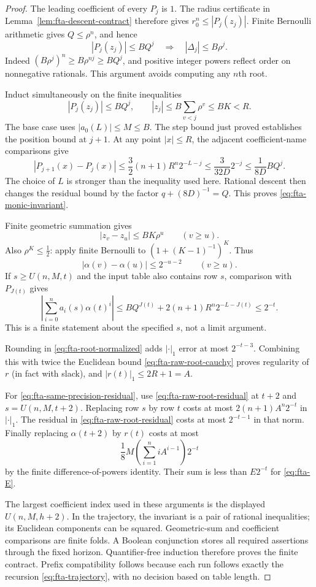 \begin{proof}
The leading coefficient of every $P_j$ is $1$.  The radius certificate
in Lemma~\ref{lem:fta-descent-contract} therefore gives
$r_0^n\le |P_j(z_j)|$.  Finite Bernoulli arithmetic gives
$Q\le\rho^n$, and hence
\[
 |P_j(z_j)|\le BQ^j\quad\Longrightarrow\quad
 |\Delta_j|\le B\rho^j.
\]
Indeed $(B\rho^j)^n\ge B\rho^{nj}\ge BQ^j$, and positive integer
powers reflect order on nonnegative rationals.  This argument avoids
computing any $n$th root.

Induct simultaneously on the finite inequalities
\[
 |P_j(z_j)|\le BQ^j,
 \qquad |z_j|\le B\sum_{v<j}\rho^v\le BK<R.
 \tag{F7}\label{eq:fta-monic-invariant}
\]
The base case uses $|a_0(L)|\le M\le B$.  The step bound just proved
establishes the position bound at $j+1$.  At any point $|x|\le R$, the
adjacent coefficient-name comparisons give
\[
 |P_{j+1}(x)-P_j(x)|
 \le\frac32(n+1)R^n2^{-L-j}
 \le\frac{3}{32D}2^{-j}
 \le\frac{1}{8D}BQ^j.
\]
The choice of $L$ is stronger than the inequality used here.  Rational
descent then changes the residual bound by the factor
$q+(8D)^{-1}=Q$.  This proves \eqref{eq:fta-monic-invariant}.

Finite geometric summation gives
\[
 |z_v-z_u|\le BK\rho^u\qquad(v\ge u).
\]
Also $\rho^K\le\tfrac12$: apply finite Bernoulli to
$(1+(K-1)^{-1})^K$.  Thus
\[
 |\alpha(v)-\alpha(u)|\le 2^{-u-2}\qquad(v\ge u).
 \tag{F8}\label{eq:fta-raw-root-cauchy}
\]
If $s\ge U(n,M,t)$ and the input table also contains row $s$, comparison
with $P_{J(t)}$ gives
\[
 \left|\sum_{i=0}^n a_i(s)\alpha(t)^i\right|
 \le BQ^{J(t)}+2(n+1)R^n2^{-L-J(t)}
 \le 2^{-t}.
 \tag{F9}\label{eq:fta-raw-root-residual}
\]
This is a finite statement about the specified $s$, not a limit argument.

Rounding in \eqref{eq:fta-root-normalized} adds $|\cdot|_1$ error at
most $2^{-t-3}$.  Combining this with twice the Euclidean bound
\eqref{eq:fta-raw-root-cauchy} proves regularity of $r$ (in fact with
slack), and $|r(t)|_1\le 2R+1=A$.

For \eqref{eq:fta-same-precision-residual}, use
\eqref{eq:fta-raw-root-residual} at $t+2$ and
$s=U(n,M,t+2)$.  Replacing row $s$ by row $t$ costs at most
$2(n+1)A^n2^{-t}$ in $|\cdot|_1$.  The residual in
\eqref{eq:fta-raw-root-residual} costs at most $2^{-t-1}$ in that norm.
Finally replacing $\alpha(t+2)$ by $r(t)$ costs at most
\[
 \frac18 M\left(\sum_{i=1}^n iA^{i-1}\right)2^{-t}
\]
by the finite difference-of-powers identity.  Their sum is less than
$E2^{-t}$ for \eqref{eq:fta-E}.

The largest coefficient index used in these arguments is the displayed
$U(n,M,h+2)$.  In the trajectory, the invariant is a pair of rational
inequalities; its Euclidean components can be squared.  Geometric-sum
and coefficient comparisons are finite folds.  A Boolean conjunction
stores all required assertions through the fixed horizon.  Quantifier-free
induction therefore proves the finite contract.  Prefix compatibility
follows because each run follows exactly the recursion
\eqref{eq:fta-trajectory}, with no decision based on table length.
\end{proof}

